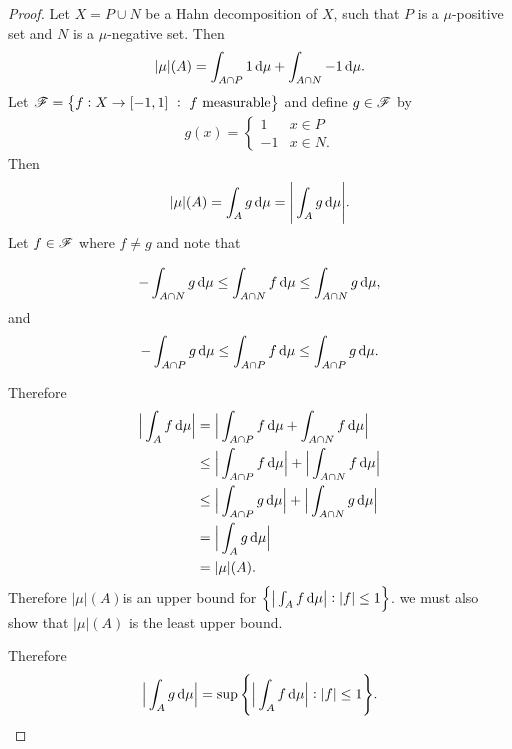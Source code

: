 

\begin{proof}
  Let $X = P \cup N$ be a Hahn decomposition of $X$, such that $P$ is a $\mu$-positive set and $N$ is
  a $\mu$-negative set. Then
  \begin{align*}
    |\mu|(A) =\int_{A\cap P} 1 \dmu + \int_{A \cap N} -1 \dmu.
  \end{align*}
  Let $\mathscr F = \big\{f: X \to [-1, 1] ~: ~ f \text{~measurable} \big\}$ and define $g \in \mathscr F$ by
  \begin{align*}
    g(x) =
    \begin{cases}
      1  & x \in P \\
      -1 & x \in N.
    \end{cases}
  \end{align*}
  Then
  \begin{align*}
    |\mu|(A) = \int_A g \dmu = \Bigg|\int_A g \dmu\Bigg|.
  \end{align*}
  Let $f \in \mathscr F$ where $f \neq g$ and note that

  \begin{align*}
    -\int_{A \cap N} g \dmu \leq \int_{A \cap N} f \dmu \leq \int_{A \cap N} g \dmu,
  \end{align*}
  and
  \begin{align*}
    -\int_{A \cap P} g \dmu \leq \int_{A \cap P} f \dmu \leq \int_{A \cap P} g \dmu.
  \end{align*}

  Therefore
  \begin{align*}
    \Big|\int_A f \dmu\Big|
    &= \Big|\int_{A \cap P} f \dmu + \int_{A \cap N} f \dmu\Big| \\
    &\leq \Big|\int_{A \cap P} f \dmu\Big| + \Big|\int_{A \cap N} f \dmu\Big| \\
    &\leq \Big|\int_{A \cap P} g \dmu\Big| + \Big|\int_{A \cap N} g \dmu\Big| \\
    &= \Big|\int_{A} g \dmu\Big| \\
    &= |\mu|(A).
  \end{align*}
  Therefore $|\mu|(A)$is an upper bound for $\Big\{ \big|\int_A f \dmu\big| : |f| \leq 1 \Big\}$.
   we must also show that $|\mu|(A)$ is the least upper bound.

  Therefore
  \begin{align*}
    \Big|\int_{A} g \dmu\Big| = \sup\Bigg\{ \Big|\int_A f \dmu\Big| : |f| \leq 1 \Bigg\}.
  \end{align*}
\end{proof}


